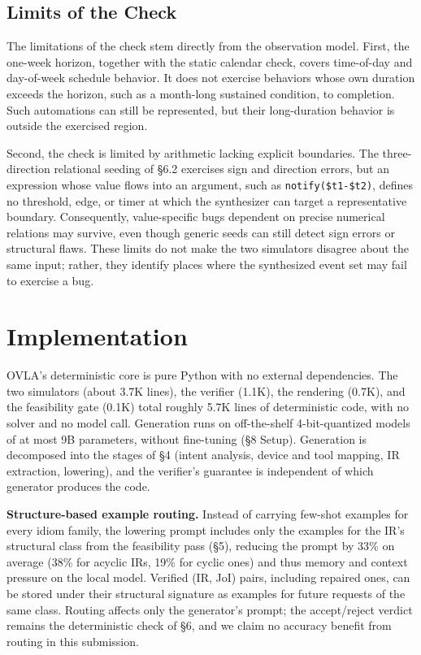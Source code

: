 \documentclass[sigconf,nonacm,anonymous,review]{acmart}
\begin{document}
\subsection{Limits of the Check}

The limitations of the check stem directly from the observation model. First, the one-week horizon, together with the static calendar check, covers time-of-day and day-of-week schedule behavior. It does not exercise behaviors whose own duration exceeds the horizon, such as a month-long sustained condition, to completion. Such automations can still be represented, but their long-duration behavior is outside the exercised region.

Second, the check is limited by arithmetic lacking explicit boundaries.
The three-direction relational seeding of \S6.2 exercises sign and direction errors, but an expression whose value flows into an argument, such as \texttt{notify(\$t1-\$t2)}, defines no threshold, edge, or timer at which the synthesizer can target a representative boundary. Consequently, value-specific bugs dependent on precise numerical relations may survive, even though generic seeds can still detect sign errors or structural flaws.
These limits do not make the two simulators disagree about the same input; rather, they identify places where the synthesized event set may fail to exercise a bug.

\section{Implementation}

OVLA's deterministic core is pure Python with no external dependencies. The two simulators (about 3.7K lines), the verifier (1.1K), the rendering (0.7K), and the feasibility gate (0.1K) total roughly 5.7K lines of deterministic code, with no solver and no model call. Generation runs on off-the-shelf 4-bit-quantized models of at most 9B parameters, without fine-tuning (\S8 Setup). Generation is decomposed into the stages of \S4 (intent analysis, device and tool mapping, IR extraction, lowering), and the verifier's guarantee is independent of which generator produces the code.

\textbf{Structure-based example routing.} Instead of carrying few-shot examples for every idiom family, the lowering prompt includes only the examples for the IR's structural class from the feasibility pass (\S5), reducing the prompt by 33\% on average (38\% for acyclic IRs, 19\% for cyclic ones) and thus memory and context pressure on the local model. Verified (IR, JoI) pairs, including repaired ones, can be stored under their structural signature as examples for future requests of the same class. Routing affects only the generator's prompt; the accept/reject verdict remains the deterministic check of \S6, and we claim no accuracy benefit from routing in this submission.
\end{document}
